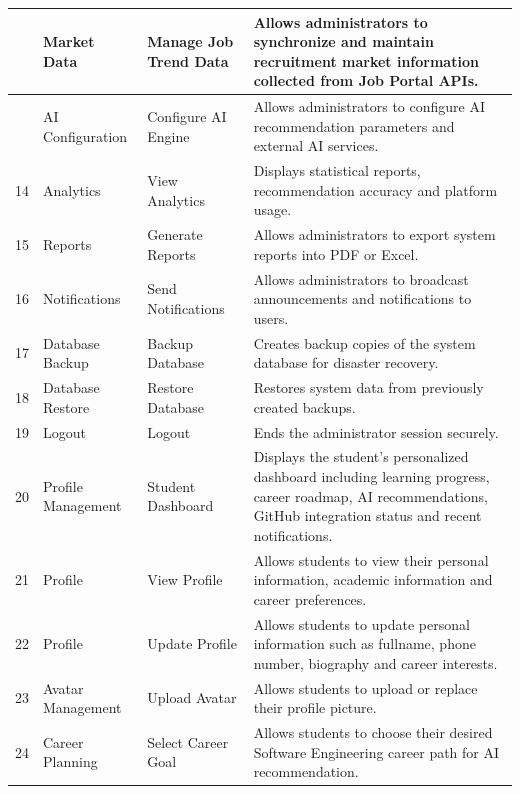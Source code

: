 \begin{longtable}{|>{\centering\arraybackslash}p{0.8cm}|p{3.2cm}|p{3.5cm}|p{8cm}|}
12 &
Market Data &
Manage Job Trend Data &
Allows administrators to synchronize and maintain recruitment market information collected from Job Portal APIs.
\\
\hline

13 &
AI Configuration &
Configure AI Engine &
Allows administrators to configure AI recommendation parameters and external AI services.
\\
\hline

14 &
Analytics &
View Analytics &
Displays statistical reports, recommendation accuracy and platform usage.
\\
\hline

15 &
Reports &
Generate Reports &
Allows administrators to export system reports into PDF or Excel.
\\
\hline

16 &
Notifications &
Send Notifications &
Allows administrators to broadcast announcements and notifications to users.
\\
\hline

17 &
Database Backup &
Backup Database &
Creates backup copies of the system database for disaster recovery.
\\
\hline

18 &
Database Restore &
Restore Database &
Restores system data from previously created backups.
\\
\hline

19 &
Logout &
Logout &
Ends the administrator session securely.
\\
\hline

20 &
Profile Management &
Student Dashboard &
Displays the student's personalized dashboard including learning progress, career roadmap, AI recommendations, GitHub integration status and recent notifications.
\\
\hline

21 &
Profile &
View Profile &
Allows students to view their personal information, academic information and career preferences.
\\
\hline

22 &
Profile &
Update Profile &
Allows students to update personal information such as fullname, phone number, biography and career interests.
\\
\hline

23 &
Avatar Management &
Upload Avatar &
Allows students to upload or replace their profile picture.
\\
\hline

24 &
Career Planning &
Select Career Goal &
Allows students to choose their desired Software Engineering career path for AI recommendation.
\\
\hline


\end{longtable}
